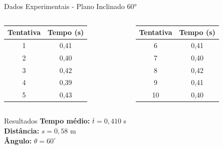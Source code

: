 \documentclass[12pt]{beamer}
\begin{document}
\begin{frame}{Dados Experimentais - Plano Inclinado 60°}
    \small
    \begin{columns}
        \begin{column}{0.5\textwidth}
            \begin{table}
                \centering
                \begin{tabular}{|c|c|}
                    \hline
                    \textbf{Tentativa} & \textbf{Tempo (s)} \\
                    \hline
                    1                  & 0,41               \\
                    2                  & 0,40               \\
                    3                  & 0,42               \\
                    4                  & 0,39               \\
                    5                  & 0,43               \\
                    \hline
                \end{tabular}
            \end{table}
        \end{column}
        \begin{column}{0.5\textwidth}
            \begin{table}
                \centering
                \begin{tabular}{|c|c|}
                    \hline
                    \textbf{Tentativa} & \textbf{Tempo (s)} \\
                    \hline
                    6                  & 0,41               \\
                    7                  & 0,40               \\
                    8                  & 0,42               \\
                    9                  & 0,41               \\
                    10                 & 0,40               \\
                    \hline
                \end{tabular}
            \end{table}
        \end{column}
    \end{columns}

    \vspace{0.3cm}
    \begin{block}{Resultados}
        \centering
        \textbf{Tempo médio:} $\bar{t} = 0,410$ s \\
        \textbf{Distância:} $s = 0,58$ m \\
        \textbf{Ângulo:} $\theta = 60^\circ$
    \end{block}
\end{frame}
\end{document}
